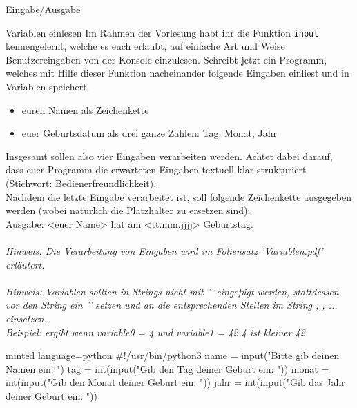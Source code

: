 \begin{task}[points=auto]{Eingabe/Ausgabe }
    \begin{subtask*}[points=0]{Variablen einlesen}
        Im Rahmen der Vorlesung habt ihr die Funktion \texttt{input} kennengelernt, welche es euch erlaubt, auf einfache Art und Weise Benutzereingaben von der Konsole einzulesen. Schreibt jetzt ein Programm, welches mit Hilfe dieser Funktion nacheinander folgende Eingaben einliest und in Variablen speichert.
        \begin{itemize}
            \item euren Namen als Zeichenkette
            \item euer Geburtsdatum als drei ganze Zahlen: Tag, Monat, Jahr
        \end{itemize}
        Insgesamt sollen also vier Eingaben verarbeiten werden. Achtet dabei darauf, dass euer Programm die erwarteten Eingaben textuell klar strukturiert (Stichwort: Bedienerfreundlichkeit).\\
        Nachdem die letzte Eingabe verarbeitet ist, soll folgende Zeichenkette ausgegeben werden (wobei natürlich die Platzhalter zu ersetzen sind):\\
        Ausgabe: {\ttfamily{\dq}}<euer Name> hat am <tt.mm.jjjj> Geburtstag.{\ttfamily{\dq}}\\
        \\
        \textit{Hinweis: Die Verarbeitung von Eingaben wird im Foliensatz 'Variablen.pdf' erläutert.}\\
        \\
        \textit{Hinweis: Variablen sollten in Strings nicht mit '\pythoninline{+}' eingefügt werden, stattdessen vor den String ein '' setzen und an die entsprechenden Stellen im String , , ... einsetzen. \\
        Beispiel:  ergibt wenn variable0 = 4 und variable1 = 42 {\ttfamily{\dq}}4 ist kleiner 42{\ttfamily{\dq}}}\\

        \begin{solution}
            \begin{codeBlock}[]{minted language=python}
                #!/usr/bin/python3
                name = input("Bitte gib deinen Namen ein: ")
                tag = int(input("Gib den Tag deiner Geburt ein: "))
                monat = int(input("Gib den Monat deiner Geburt ein: "))
                jahr = int(input("Gib das Jahr deiner Geburt ein: "))


\end{codeBlock}
\end{solution}
\end{subtask*}
\end{task}

